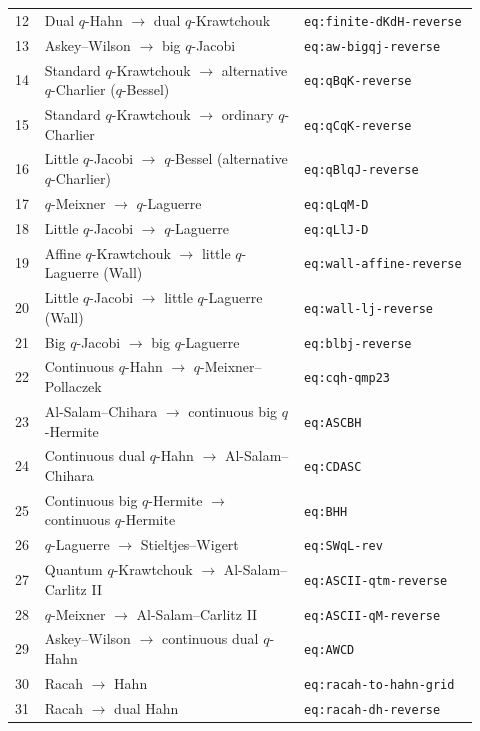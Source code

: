 \documentclass[11pt]{article}
\begin{document}
\begin{longtable}{@{}p{0.05\linewidth}p{0.52\linewidth}p{0.35\linewidth}@{}}
12 & Dual $q$-Hahn $\ensuremath{\to}$ dual $q$-Krawtchouk & \texttt{eq:finite-dKdH-reverse} \\
13 & Askey--Wilson $\ensuremath{\to}$ big $q$-Jacobi & \texttt{eq:aw-bigqj-reverse} \\
14 & Standard $q$-Krawtchouk $\ensuremath{\to}$ alternative $q$-Charlier ($q$-Bessel) & \texttt{eq:qBqK-reverse} \\
15 & Standard $q$-Krawtchouk $\ensuremath{\to}$ ordinary $q$-Charlier & \texttt{eq:qCqK-reverse} \\
16 & Little $q$-Jacobi $\ensuremath{\to}$ $q$-Bessel (alternative $q$-Charlier) & \texttt{eq:qBlqJ-reverse} \\
17 & $q$-Meixner $\ensuremath{\to}$ $q$-Laguerre & \texttt{eq:qLqM-D} \\
18 & Little $q$-Jacobi $\ensuremath{\to}$ $q$-Laguerre & \texttt{eq:qLlJ-D} \\
19 & Affine $q$-Krawtchouk $\ensuremath{\to}$ little $q$-Laguerre (Wall) & \texttt{eq:wall-affine-reverse} \\
20 & Little $q$-Jacobi $\ensuremath{\to}$ little $q$-Laguerre (Wall) & \texttt{eq:wall-lj-reverse} \\
21 & Big $q$-Jacobi $\ensuremath{\to}$ big $q$-Laguerre & \texttt{eq:blbj-reverse} \\
22 & Continuous $q$-Hahn $\ensuremath{\to}$ $q$-Meixner--Pollaczek & \texttt{eq:cqh-qmp23} \\
23 & Al-Salam--Chihara $\ensuremath{\to}$ continuous big $q$-Hermite & \texttt{eq:ASCBH} \\
24 & Continuous dual $q$-Hahn $\ensuremath{\to}$ Al-Salam--Chihara & \texttt{eq:CDASC} \\
25 & Continuous big $q$-Hermite $\ensuremath{\to}$ continuous $q$-Hermite & \texttt{eq:BHH} \\
26 & $q$-Laguerre $\ensuremath{\to}$ Stieltjes--Wigert & \texttt{eq:SWqL-rev} \\
27 & Quantum $q$-Krawtchouk $\ensuremath{\to}$ Al-Salam--Carlitz II & \texttt{eq:ASCII-qtm-reverse} \\
28 & $q$-Meixner $\ensuremath{\to}$ Al-Salam--Carlitz II & \texttt{eq:ASCII-qM-reverse} \\
29 & Askey--Wilson $\ensuremath{\to}$ continuous dual $q$-Hahn & \texttt{eq:AWCD} \\
30 & Racah $\ensuremath{\to}$ Hahn & \texttt{eq:racah-to-hahn-grid} \\
31 & Racah $\ensuremath{\to}$ dual Hahn & \texttt{eq:racah-dh-reverse} \\

\end{longtable}
\end{document}
